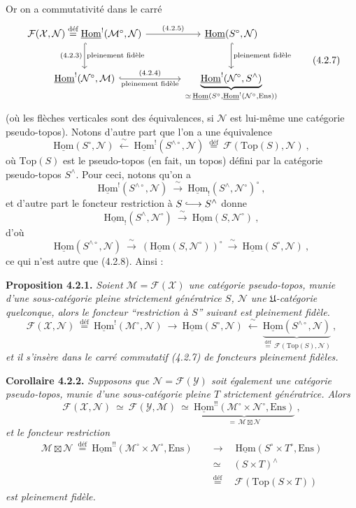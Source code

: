 \documentclass[11pt]{article}
\newcommand{\printedpage}[1]{\if\relax\detokenize{#1}\relax\else\marginpar{\footnotesize p.~#1}\fi}
\newcommand{\msp}[1]{\marginpar{\footnotesize [#1]}}
\newcommand{\uHom}{\underline{\mathrm{Hom}}}
\newcommand{\Ens}{\mathrm{Ens}}
\newcommand{\cM}{\mathcal{M}}
\newcommand{\cN}{\mathcal{N}}
\newcommand{\cX}{\mathcal{X}}
\newcommand{\cY}{\mathcal{Y}}
\newcommand{\cF}{\mathcal{F}}
\newcommand{\Top}{\mathrm{Top}}
\newcommand{\defeq}{\overset{\text{déf}}{=}}
\newcommand{\bt}{\boxtimes}
\newcommand{\linj}{\lhook\joinrel\longrightarrow}
\begin{document}
\msp{page 60}
Or on a commutativité dans le carré
\[
\begin{tikzcd}[column sep=large, row sep=large]
\cF(\cX,\cN) \defeq \uHom^{!}(\cM^{\circ},\cN) \arrow[r, "\text{\scriptsize(4.2.5)}"] \arrow[d, hook, "\text{\scriptsize(4.2.3)}"', "\text{\scriptsize pleinement fidèle}"] & \uHom(S^{\circ},\cN) \arrow[d, hook, "\text{\scriptsize pleinement fidèle}"] \\
\uHom^{!}(\cN^{\circ},\cM) \arrow[r, hook, "\text{\scriptsize(4.2.4)}", "\text{\scriptsize pleinement fidèle}"'] & \underbrace{\uHom^{!}(\cN^{\circ},S^{\wedge})}_{\simeq\, \uHom(S^{\circ},\uHom^{!}(\cN^{\circ},\Ens))}
\end{tikzcd}
\tag*{(4.2.7)}
\]
(où les flèches verticales sont des équivalences, si $\cN$ est lui-même une catégorie pseudo-topos). Notons d'autre part que l'on a une équivalence
\[
\uHom(S^{\circ},\cN) \ \xleftarrow{\ \sim\ }\ \uHom^{!}(S^{\wedge\circ},\cN) \ \defeq\ \cF(\Top(S),\cN) \ ,
\tag*{(4.2.8)}
\]
où $\Top(S)$ est le pseudo-topos (en fait, un topos) défini par la catégorie pseudo-topos $S^{\wedge}$. Pour ceci, notons qu'on a
\[
\uHom^{!}(S^{\wedge\circ},\cN) \ \xrightarrow{\ \sim\ }\ \uHom_{!}(S^{\wedge},\cN^{\circ})^{\circ} \ ,
\]
et d'autre part le foncteur restriction à $S \linj S^{\wedge}$ donne
\[
\uHom_{!}(S^{\wedge},\cN^{\circ}) \ \xrightarrow{\ \sim\ }\ \uHom(S,\cN^{\circ}) \ ,
\]
d'où
\printedpage{6}
\msp{page 61}
\[
\uHom(S^{\wedge\circ},\cN) \ \xrightarrow{\ \sim\ }\ (\uHom(S,\cN^{\circ}))^{\circ} \ \xrightarrow{\ \sim\ }\ \uHom(S^{\circ},\cN) \ ,
\]
ce qui n'est autre que (4.2.8). Ainsi :

\textbf{Proposition 4.2.1.} \textit{Soient $\cM=\cF(\cX)$ une catégorie pseudo-topos, munie d'une sous-catégorie pleine strictement génératrice $S$, $\cN$ une $\mathfrak{U}$-catégorie quelconque, alors le foncteur “restriction à $S$” suivant est pleinement fidèle.}
\[
\cF(\cX,\cN) \ \defeq\ \uHom^{!}(\cM^{\circ},\cN) \ \longrightarrow\ \uHom(S^{\circ},\cN) \ \xleftarrow{\ \sim\ }\ \underbrace{\uHom(S^{\wedge\circ},\cN)}_{\defeq\, \cF(\Top(S),\cN)} \ ,
\tag*{(4.2.1.1)}
\]
\textit{et il s'insère dans le carré commutatif (4.2.7) de foncteurs pleinement fidèles.}

\textbf{Corollaire 4.2.2.} \textit{Supposons que $\cN=\cF(\cY)$ soit également une catégorie pseudo-topos, munie d'une sous-catégorie pleine $T$ strictement génératrice. Alors}
\[
\cF(\cX,\cN) \ \simeq\ \cF(\cY,\cM) \ \simeq\ \underbrace{\uHom^{!!}(\cM^{\circ}\times\cN^{\circ},\Ens)}_{=\,\cM\bt\cN} \ ,
\]
\textit{et le foncteur restriction}
\[
\begin{aligned}
\cM\bt\cN \ \defeq\ \uHom^{!!}(\cM^{\circ}\times\cN^{\circ},\Ens) \quad &\longrightarrow \quad \uHom(S^{\circ}\times T^{\circ},\Ens)\\
&\simeq \quad (S\times T)^{\wedge}\\
&\defeq \quad \cF(\Top(S\times T))
\end{aligned}
\tag*{(4.2.2.1)}
\]
\textit{est pleinement fidèle.}
\end{document}
